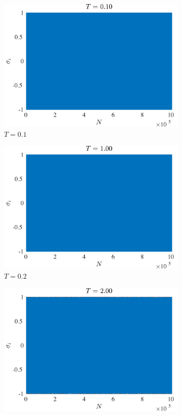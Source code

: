 \documentclass[12pt]{article}
\begin{document}
\begin{figure}
	\centering
	\begin{subfigure}[b]{0.49\textwidth}
		\centering
		\includegraphics[width=\textwidth]{2D/2D1e7/meansigT0.1.pdf}
		\caption{$T=0.1$}
	\end{subfigure}
	\hfill
	\begin{subfigure}[b]{0.49\textwidth}
		\centering
		\includegraphics[width=\textwidth]{2D/2D1e7/meansigT1.pdf}
		\caption{$T=0.2$}
	\end{subfigure}
	\hfill
	\begin{subfigure}[b]{0.49\textwidth}
		\centering
		\includegraphics[width=\textwidth]{2D/2D1e7/meansigT2.pdf}

\end{subfigure}
\end{figure}
\end{document}
